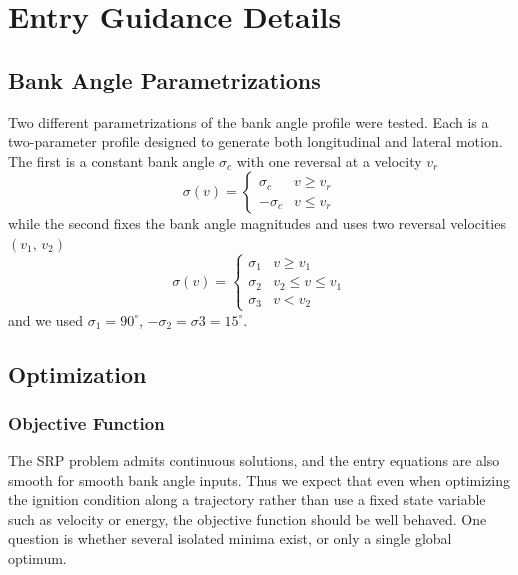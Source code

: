\documentclass[]{article}
\begin{document}
\section{Entry Guidance Details}


\subsection{Bank Angle Parametrizations}
Two different parametrizations of the bank angle profile were tested. Each is a two-parameter profile designed to generate both longitudinal and lateral motion. The first is a constant bank angle $\sigma_c$ with one reversal at a velocity $v_r$
\begin{equation}
\sigma(v) = \left\{
\begin{array}{ll}
\sigma_c & v\geq v_r \\
-\sigma_c & v\le v_r
\end{array} 
\right.
\end{equation}
while the second fixes the bank angle magnitudes and uses two reversal velocities $(v_1,\,v_2)$
\begin{equation}
\sigma(v) = \left\{
\begin{array}{ll}
\sigma_1 & v\geq v_1 \\
\sigma_2 & v_2\leq v\le v_1 \\
\sigma_3 & v< v_2
\end{array} 
\right.
\end{equation}
and we used $\sigma_1 = 90^\circ$, $-\sigma_2 = \sigma3 = 15^\circ$.
\subsection{Optimization}

\subsubsection{Objective Function}
The SRP problem admits continuous solutions, and the entry equations are also smooth for smooth bank angle inputs. Thus we expect that even when optimizing the ignition condition along a trajectory rather than use a fixed state variable such as velocity or energy, the objective function should be well behaved. One question is whether several isolated minima exist, or only a single global optimum. 
\end{document}
